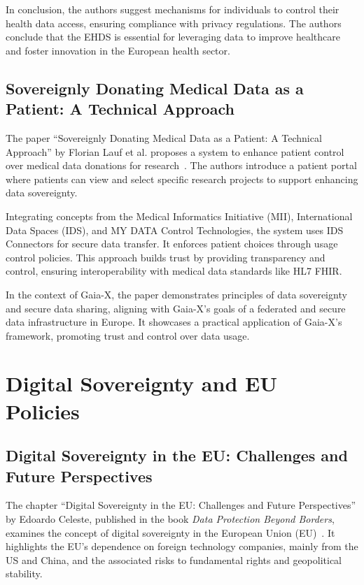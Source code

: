 In conclusion, the authors suggest mechanisms for individuals to control their health data access, ensuring compliance with privacy regulations.
The authors conclude that the EHDS is essential for leveraging data to improve healthcare and foster innovation in the European health sector.

\subsection[Sovereignly Donating Medical Data as a Patient]{Sovereignly Donating Medical Data as a Patient: A Technical Approach}\label{subsec:sovereignly-donating-medical-data-as-a-patient:-a-technical-approach}

The paper ``Sovereignly Donating Medical Data as a Patient: A Technical Approach'' by Florian Lauf et al. proposes a system to enhance patient control over medical data donations for research~\cite{sovereignly_donating_medical_data}.
The authors introduce a patient portal where patients can view and select specific research projects to support enhancing data sovereignty.

Integrating concepts from the Medical Informatics Initiative (MII), International Data Spaces (IDS), and MY DATA Control Technologies, the system uses IDS Connectors for secure data transfer.
It enforces patient choices through usage control policies.
This approach builds trust by providing transparency and control, ensuring interoperability with medical data standards like HL7 FHIR.

In the context of Gaia-X, the paper demonstrates principles of data sovereignty and secure data sharing, aligning with Gaia-X's goals of a federated and secure data infrastructure in Europe.
It showcases a practical application of Gaia-X's framework, promoting trust and control over data usage.

\section{Digital Sovereignty and EU Policies}\label{sec:digital-sovereignty-and-eu-policies}

\subsection{Digital Sovereignty in the EU: Challenges and Future Perspectives}\label{subsec:digital-sovereignty-in-the-eu:-challenges-and-future-perspectives}

The chapter ``Digital Sovereignty in the EU: Challenges and Future Perspectives'' by Edoardo Celeste, published in the book \textit{Data Protection Beyond Borders}, examines the concept of digital sovereignty in the European Union (EU)~\cite{dig_sovereignty_challenges}.
It highlights the EU's dependence on foreign technology companies, mainly from the US and China, and the associated risks to fundamental rights and geopolitical stability.

